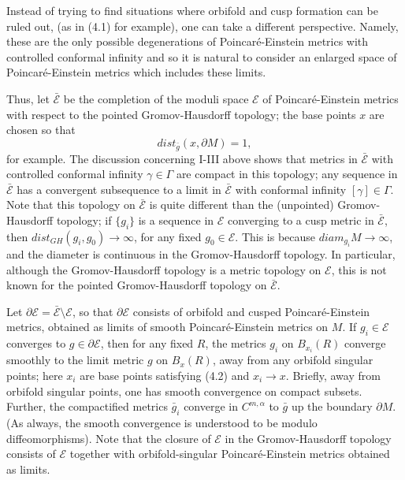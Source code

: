 \documentclass[11pt,amsfonts]{amsart}
\begin{document}
\medskip

 Instead of trying to find situations where orbifold and cusp formation 
can be ruled out, (as in (4.1) for example), one can take a different 
perspective. Namely, these are the only possible degenerations of 
Poincar\'e-Einstein metrics with controlled conformal infinity and so 
it is natural to consider an enlarged space of Poincar\'e-Einstein 
metrics which includes these limits. 

 Thus, let $\bar{\mathcal E}$ be the completion of the moduli space 
${\mathcal E}$ of Poincar\'e-Einstein metrics with respect to the pointed 
Gromov-Hausdorff topology; the base points $x$ are 
chosen so that 
\begin{equation} \label{e4.2}
dist_{\bar g}(x, \partial M) = 1, 
\end{equation}
for example. The discussion concerning I-III above shows that metrics in 
$\bar{\mathcal E}$ with controlled conformal infinity $\gamma \in \Gamma$ are 
compact in this topology; any sequence in $\bar{\mathcal E}$ has a convergent 
subsequence to a limit in $\bar{\mathcal E}$ with conformal infinity 
$[\gamma] \in \Gamma$. Note that this topology on $\bar{\mathcal E}$ is quite 
different than the (unpointed) Gromov-Hausdorff topology; if $\{g_{i}\}$ is a 
sequence in ${\mathcal E}$ converging to a cusp metric in $\bar{\mathcal E}$, 
then $dist_{GH}(g_{i}, g_{0}) \rightarrow  \infty$, for any fixed 
$g_{0}\in{\mathcal E}$. This is because $diam_{g_{i}}M \rightarrow \infty$, 
and the diameter is continuous in the Gromov-Hausdorff topology. In 
particular, although the Gromov-Hausdorff topology is a metric 
topology on ${\mathcal E}$, this is not known for the pointed Gromov-Hausdorff 
topology on $\bar{\mathcal E}$. 

 Let $\partial{\mathcal E} = \bar{\mathcal E}\setminus {\mathcal E}$, 
so that $\partial{\mathcal E}$ consists of orbifold and cusped 
Poincar\'e-Einstein metrics, obtained as limits of smooth 
Poincar\'e-Einstein metrics on $M$. If $g_{i}\in{\mathcal E}$ converges to 
$g\in\partial{\mathcal E}$, then for any fixed $R$, the metrics $g_{i}$ on 
$B_{x_{i}}(R)$ converge smoothly to the limit metric $g$ on $B_{x}(R)$, 
away from any orbifold singular points; here $x_{i}$ are base points 
satisfying (4.2) and $x_{i} \rightarrow x$. Briefly, away from 
orbifold singular points, one has smooth convergence on compact subsets. 
Further, the compactified metrics $\bar g_{i}$ converge in $C^{m,\alpha}$ 
to $\bar g$ up the boundary $\partial M$. (As always, the smooth convergence 
is understood to be modulo diffeomorphisms). Note that the closure of 
${\mathcal E}$ in the Gromov-Hausdorff topology consists of ${\mathcal E}$ 
together with orbifold-singular Poincar\'e-Einstein metrics obtained as 
limits. 
\end{document}
